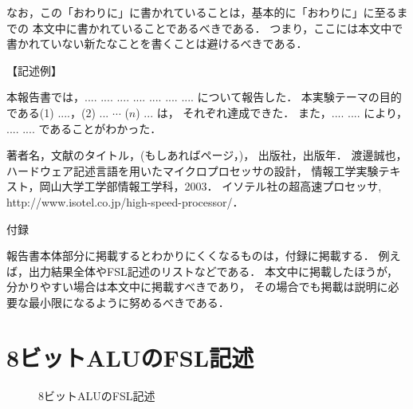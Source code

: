 \documentclass{jarticle}[11pt]
\begin{document}
なお，この「おわりに」に書かれていることは，基本的に「おわりに」に至るまでの
本文中に書かれていることであるべきである．
つまり，ここには本文中で書かれていない新たなことを書くことは避けるべきである．

\noindent
【記述例】

本報告書では，.... .... .... .... .... .... .... について報告した．
本実験テーマの目的である(1) ....，(2) ... $\cdots$ ($n$) ... は，
それぞれ達成できた．
また，.... .... により， .... .... であることがわかった．

\begin{thebibliography}{9}
 著者名，文献のタイトル，(もしあればページ，)，
出版社，出版年．
渡邊誠也，ハードウェア記述言語を用いたマイクロプロセッサの設計，
情報工学実験テキスト，岡山大学工学部情報工学科，2003．
イソテル社の超高速プロセッサ, http://www.isotel.co.jp/high-speed-processor/．
\end{thebibliography}


\newpage
\appendix

\noindent
{\Large \gt 付録}

報告書本体部分に掲載するとわかりにくくなるものは，付録に掲載する．
例えば，出力結果全体やFSL記述のリストなどである．
本文中に掲載したほうが，分かりやすい場合は本文中に掲載すべきであり，
その場合でも掲載は説明に必要な最小限になるように努めるべきである．

\section{8ビットALUのFSL記述}
\label{appsec:8ビットALUのFSL記述}

\begin{figure}[hbtp]
\begin{center}

\caption{8ビットALUのFSL記述}
\label{fig:8ビットALUのFSL記述}
\end{center}
\end{figure}
\end{document}
